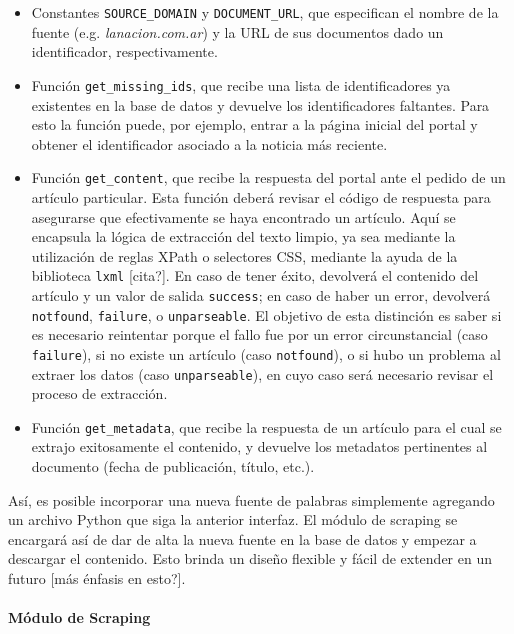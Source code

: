 \begin{itemize}

\item Constantes \texttt{SOURCE\_DOMAIN} y \texttt{DOCUMENT\_URL}, que especifican el nombre de la
fuente (e.g. \textit{lanacion.com.ar}) y la URL de sus documentos dado un identificador,
respectivamente.

\item Función \texttt{get\_missing\_ids}, que recibe una lista de identificadores ya existentes en la
base de datos y devuelve los identificadores faltantes. Para esto la función puede, por ejemplo,
entrar a la página inicial del portal y obtener el identificador asociado a la noticia más reciente.

\item Función \texttt{get\_content}, que recibe la respuesta del portal ante el pedido de un artículo
particular. Esta función deberá revisar el código de respuesta para asegurarse que efectivamente se
haya encontrado un artículo. Aquí se encapsula la lógica de extracción del texto limpio, ya sea
mediante la utilización de reglas XPath o selectores CSS, mediante la ayuda de la biblioteca
\texttt{lxml} [cita?]. En caso de tener éxito, devolverá el contenido del artículo y un valor de
salida \texttt{success}; en caso de haber un error, devolverá \texttt{notfound}, \texttt{failure}, o
\texttt{unparseable}. El objetivo de esta distinción es saber si es necesario reintentar porque el
fallo fue por un error circunstancial (caso \texttt{failure}), si no existe un artículo (caso
\texttt{notfound}), o si hubo un problema al extraer los datos (caso \texttt{unparseable}), en cuyo
caso será necesario revisar el proceso de extracción.

\item Función \texttt{get\_metadata}, que recibe la respuesta de un artículo para el cual se extrajo
exitosamente el contenido, y devuelve los metadatos pertinentes al documento (fecha de publicación,
título, etc.).

\end{itemize}

Así, es posible incorporar una nueva fuente de palabras simplemente agregando un archivo Python que
siga la anterior interfaz. El módulo de scraping se encargará así de dar de alta la nueva fuente en
la base de datos y empezar a descargar el contenido. Esto brinda un diseño flexible y fácil de
extender en un futuro [más énfasis en esto?].


\paragraph{Módulo de Scraping}

